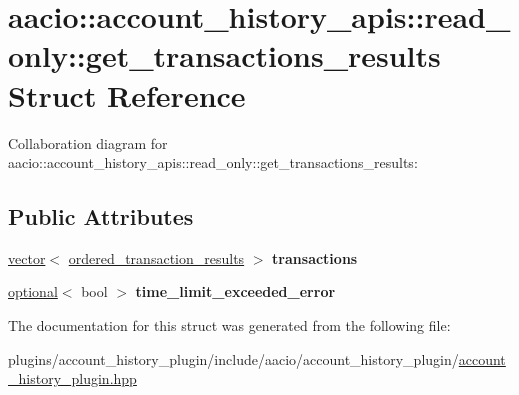 \hypertarget{structaacio_1_1account__history__apis_1_1read__only_1_1get__transactions__results}{}\section{aacio\+:\+:account\+\_\+history\+\_\+apis\+:\+:read\+\_\+only\+:\+:get\+\_\+transactions\+\_\+results Struct Reference}
\label{structaacio_1_1account__history__apis_1_1read__only_1_1get__transactions__results}


Collaboration diagram for aacio\+:\+:account\+\_\+history\+\_\+apis\+:\+:read\+\_\+only\+:\+:get\+\_\+transactions\+\_\+results\+:
\subsection*{Public Attributes}
\begin{DoxyCompactItemize}
\item 
\mbox{\label{structaacio_1_1account__history__apis_1_1read__only_1_1get__transactions__results_a619b9c67b2d7056baed3b2f66dca679e}} 
\mbox{\hyperlink{classstd_1_1vector}{vector}}$<$ \mbox{\hyperlink{structaacio_1_1account__history__apis_1_1read__only_1_1ordered__transaction__results}{ordered\+\_\+transaction\+\_\+results}} $>$ {\bfseries transactions}
\item 
\mbox{\label{structaacio_1_1account__history__apis_1_1read__only_1_1get__transactions__results_a4fe7b0cfb3bec8ea1d1c3ed964384af4}} 
\mbox{\hyperlink{classaacio_1_1optional}{optional}}$<$ bool $>$ {\bfseries time\+\_\+limit\+\_\+exceeded\+\_\+error}
\end{DoxyCompactItemize}


The documentation for this struct was generated from the following file\+:\begin{DoxyCompactItemize}
\item 
plugins/account\+\_\+history\+\_\+plugin/include/aacio/account\+\_\+history\+\_\+plugin/\mbox{\hyperlink{account__history__plugin_8hpp}{account\+\_\+history\+\_\+plugin.\+hpp}}\end{DoxyCompactItemize}
